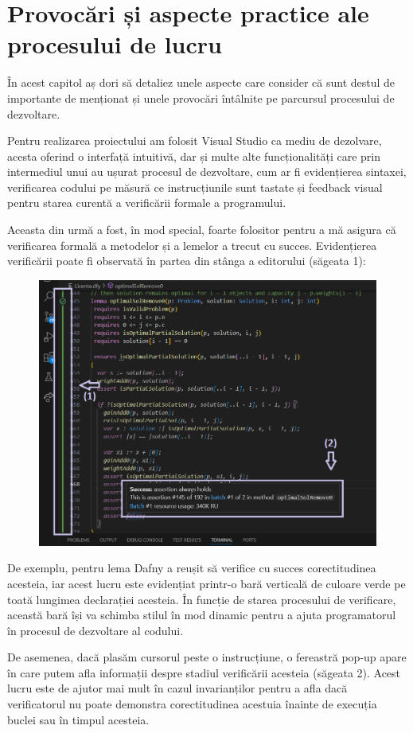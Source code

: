 \chapter{Provocări și aspecte practice ale procesului de lucru}
\begin{sloppypar}

În acest capitol aș dori să detaliez unele aspecte care consider că sunt destul de importante de menționat și unele provocări întâlnite pe parcursul procesului de dezvoltare. \par
Pentru realizarea proiectului am folosit Visual Studio ca mediu de dezolvare, acesta oferind o interfață intuitivă, dar și multe alte funcționalități care prin intermediul unui  au ușurat procesul de dezvoltare, cum ar fi evidențierea sintaxei, verificarea codului pe măsură ce instrucțiunile sunt tastate și feedback visual pentru starea curentă a verificării formale a programului. \par
Aceasta din urmă a fost, în mod special, foarte folositor pentru a mă asigura că verificarea formală a metodelor și a lemelor a trecut cu succes. Evidențierea verificării poate fi observată în partea din stânga a editorului (săgeata 1):
\begin{figure}[!ht]
    \centering
    \includegraphics[width=0.6\linewidth]{images/imageVerificationSucceeded.png}
\end{figure}
 \par De exemplu, pentru lema  Dafny a reușit să verifice cu succes corectitudinea acesteia, iar acest lucru este evidențiat printr-o bară verticală de culoare verde pe toată lungimea declarației acesteia. În funcție de starea procesului de verificare, această bară își va schimba stilul în mod dinamic pentru a ajuta programatorul în procesul de dezvoltare al codului.
 \par De asemenea, dacă plasăm cursorul peste o instrucțiune, o fereastră pop-up apare în care putem afla informații despre stadiul verificării acesteia (săgeata 2). Acest lucru este de ajutor mai mult în cazul invarianților pentru a afla dacă verificatorul nu poate demonstra corectitudinea acestuia înainte de execuția buclei sau în timpul acesteia. \par

\end{sloppypar}
